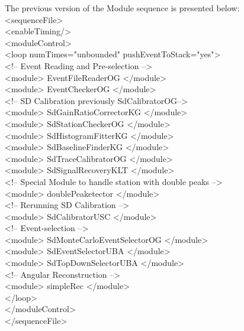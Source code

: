 The previous version of the Module sequence is presented below:
\begingroup
  \selectfont \\ 
  \noindent <sequenceFile>\\
  \null\quad <enableTiming/>\\
  \null\quad <moduleControl>\\
  \null\qquad <loop numTimes="unbounded" pushEventToStack="yes"> \\
    \null\qquad \quad  <!-- Event Reading and Pre-selection -->\\
    \null\qquad \quad  <module> EventFileReaderOG </module>\\
    \null \qquad \quad  <module> EventCheckerOG </module>\\
    \null\qquad \quad  <!-- SD Calibration previously SdCalibratorOG-->\\
    \null\qquad \quad   <module> SdGainRatioCorrectorKG </module>\\
    \null\qquad \quad   <module> SdStationCheckerOG </module>\\
    \null\qquad \quad   <module> SdHistogramFitterKG </module>\\
    \null\qquad \quad   <module> SdBaselineFinderKG </module>\\
    \null\qquad \quad   <module> SdTraceCalibratorOG </module>\\
    \null\qquad \quad   <module> SdSignalRecoveryKLT </module>\\
    \null\qquad \quad  <!-- Special Module to handle station with double peaks -->\\
    \null\qquad \quad   <module> doublePeaketector </module>\\
    \null\qquad \quad  <!-- Rerunning SD Calibration -->\\
    \null\qquad \quad   <module> SdCalibratorUSC </module>\\
    \null\qquad \quad  <!-- Event-selection -->\\
    \null\qquad \quad   <module> SdMonteCarloEventSelectorOG </module>\\
    \null\qquad \quad   <module> SdEventSelectorUBA </module>\\
    \null\qquad \quad   <module> SdTopDownSelectorUBA </module>\\
    \null\qquad \quad  <!-- Angular Reconstruction -->\\
    \null\qquad \quad   <module> simpleRec </module>\\
  \null \qquad  </loop>\\
  \null \quad  </moduleControl>\\
   </sequenceFile>\\
\endgroup

